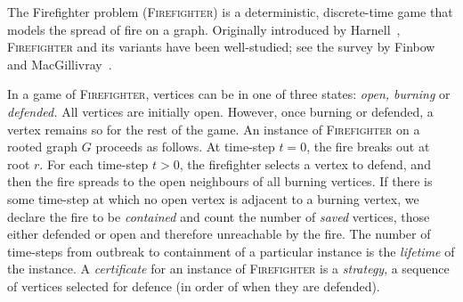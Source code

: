 \documentclass[unknownkeysallowed]{article}
\theoremstyle{definition}\newtheorem{strategy}{Strategy}
\theoremstyle{definition}\newtheorem{notation}{Notation}[theorem]
\newcommand*{\Fire}{\textup{\textsc{Firefighter}}\xspace} %
\begin{document}
The Firefighter problem (\Fire) is a deterministic, discrete-time game that models the spread of fire on a graph.  Originally introduced by Harnell~\cite{hartnell_1995}, \Fire and its variants have been well-studied; see the survey by Finbow and MacGillivray~\cite{finbow_2009}.

In a game of \Fire, vertices can be in one of three states: \emph{open, burning} or \emph{defended.} All vertices are initially open. However, once burning or defended, a vertex remains so for the rest of the game. 
An instance of \Fire on a rooted graph $G$ proceeds as follows. At time-step $t=0$, the fire breaks out at root $r$. For each time-step $t>0$, the firefighter selects a vertex to defend, and then the fire spreads to the open neighbours of all burning vertices. If there is some time-step at which no open vertex is adjacent to a burning vertex, we declare the fire to be \emph{contained} and count the number of \emph{saved} vertices, those either defended or open and therefore unreachable by the fire. The number of time-steps from outbreak to containment of a particular instance is the \emph{lifetime} of the instance.  A \emph{certificate} for an instance of \Fire is a \emph{strategy}, a sequence of vertices selected for defence (in order of when they are defended).
\end{document}
